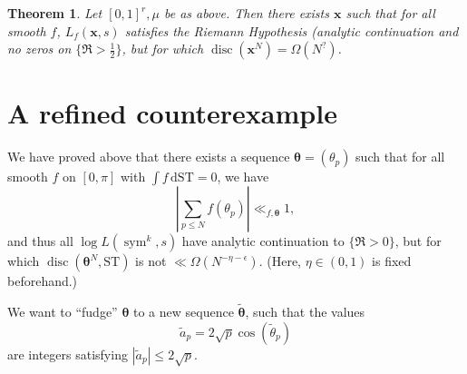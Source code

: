 \documentclass{article}
\DeclareMathOperator{\disc}{disc}
\DeclareMathOperator{\sym}{sym}
\newcommand{\btheta}{{\boldsymbol{\theta}}}
\newcommand{\bx}{{\boldsymbol x}}
\newcommand{\dd}{\mathrm{d}}
\newcommand{\ST}{\mathrm{ST}}
\newtheorem{theorem}[subsection]{Theorem}
\theoremstyle{definition}
\begin{document}
\begin{theorem}
Let $[0,1]^r,\mu$ be as above. Then there exists $\bx$ such that for all smooth 
$f$, $L_f(\bx,s)$ satisfies the Riemann Hypothesis (analytic continuation and 
no zeros on $\{\Re>\frac 1 2\}$, but for which 
$\disc(\bx^N)=\Omega(N^?)$. 
\end{theorem}





\section{A refined counterexample}

We have proved above that there exists a sequence $\btheta=(\theta_p)$ such 
that for all smooth $f$ on $[0,\pi]$ with $\int f\, \dd\ST=0$, we have 
\[
	\left| \sum_{p\leqslant N} f(\theta_p)\right| \ll_{f,\btheta} 1 ,
\]
and thus all $\log L(\sym^k,s)$ have analytic continuation to $\{\Re >0\}$, but 
for which $\disc(\btheta^N,\ST)$ is not $\ll \Omega(N^{-\eta-\epsilon})$. 
(Here, $\eta\in (0,1)$ is fixed beforehand.)

We want to ``fudge'' $\btheta$ to a new sequence $\widetilde\btheta$, such that 
the values 
\[
	\widetilde a_p = 2\sqrt p \cos(\widetilde\theta_p)
\]
are integers satisfying $|\widetilde a_p| \leqslant 2\sqrt p$. 







\end{document}
